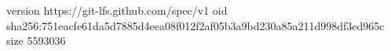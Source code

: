 version https://git-lfs.github.com/spec/v1
oid sha256:751eacfe61da5d7885d4eea08f012f2af05b3a9bd230a85a211d998df3ed965c
size 5593036
